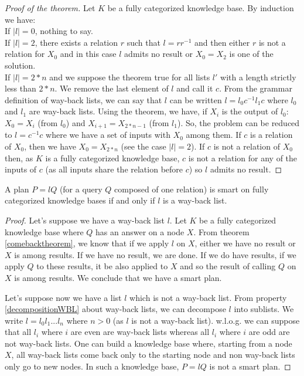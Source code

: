 \documentclass[10pt,a4paper,draft]{article}
\begin{document}
\begin{proof}[Proof of the theorem]
Let $K$ be a fully categorized knowledge base. By induction we have: \\
If $|l| = 0$, nothing to say. \\
If $|l| = 2$, there exists a relation $r$ such that $l = r r^{-1}$ and then either $r$ is not a relation for $X_0$ and in this case $l$ admits no result or $X_0 = X_2$ is one of the solution. \\
If $|l| = 2*n$ and we suppose the theorem true for all lists $l'$ with a length strictly less than $2*n$. We remove the last element of $l$ and call it $c$. From the grammar definition of way-back lists, we can say that $l$ can be written $l = l_0 c^{-1} l_1 c$ where $l_0$ and $l_1$ are way-back lists. Using the theorem, we have, if $X_i$ is the output of $l_0$: $X_0 = X_i$ (from $l_0$) and $X_{i+1} = X_{2*n - 1}$ (from $l_1$). So, the problem can be reduced to $l = c^{-1} c$ where we have a set of inputs with $X_0$ among them. If $c$ is a relation of $X_0$, then we have $X_0 = X_{2*n}$ (see the case $|l| = 2$). If $c$ is not a relation of $X_0$ then, as $K$ is a fully categorized knowledge base, $c$ is not a relation for any of the inputs of $c$ (as all inputs share the relation before $c$) so $l$ admits no result.
\end{proof}

\begin{Theorem}
\label{descriptiontheorem}
A plan $P = lQ$ (for a query $Q$ composed of one relation) is smart on fully categorized knowledge bases if and only if $l$ is a way-back list.
\end{Theorem}

\begin{proof}

Let's suppose we have a way-back list $l$. Let $K$ be a fully categorized knowledge base where $Q$ has an answer on a node $X$. From theorem \ref{comebacktheorem}, we know that if we apply $l$ on $X$, either we have no result or $X$ is among results. If we have no result, we are done. If we do have results, if we apply $Q$ to these results, it be also applied to $X$ and so the result of calling $Q$ on $X$ is among results. We conclude that we have a smart plan.

Let's suppose now we have a list $l$ which is not a way-back list. From property \ref{decompositionWBL} about way-back lists, we can decompose $l$ into sublists. We write $l = l_0 l_1 ... l_n$ where $n > 0$ (as $l$ is not a way-back list). w.l.o.g. we can suppose that all $l_i$ where $i$ are even are way-back lists whereas all $l_i$ where $i$ are odd are not way-back lists. One can build a knowledge base where, starting from a node $X$, all way-back lists come back only to the starting node and non way-back lists only go to new nodes. In such a knowledge base, $P=lQ$ is not a smart plan.
\end{proof}
\end{document}
